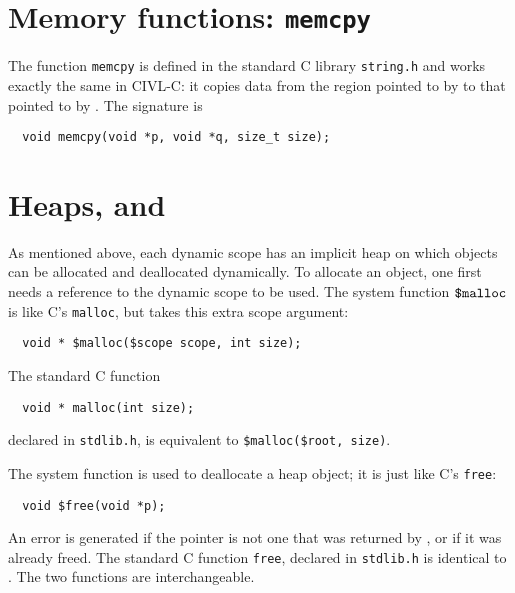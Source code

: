 \section{Memory functions: \texttt{memcpy}}

The function \texttt{memcpy} is defined in the standard C library
\texttt{string.h} and works exactly the same in CIVL-C: it copies
data from the region pointed to by  to that pointed to by
.  The signature is

\begin{verbatim}
  void memcpy(void *p, void *q, size_t size);
\end{verbatim}

\section{Heaps, \cmalloc{} and \cfree}

As mentioned above, each dynamic scope has an implicit heap on which
objects can be allocated and deallocated dynamically.  To allocate an
object, one first needs a reference to the dynamic scope to be used.
The system function $\mbox{\texttt{\${}malloc}}$ is like C's \texttt{malloc}, but takes
this extra scope argument:
\begin{verbatim}
  void * $malloc($scope scope, int size);
\end{verbatim}
The standard C function
\begin{verbatim}
  void * malloc(int size);
\end{verbatim}
declared in \texttt{stdlib.h}, is equivalent to \verb!$malloc($root, size)!.

The system function \cfree{} is used to deallocate a heap object;
it is just like C's \texttt{free}:
\begin{verbatim}
  void $free(void *p);
\end{verbatim}
An error is generated if the pointer is not one that was returned by
\cmalloc, or if it was already freed.  The standard C function
\texttt{free}, declared in \texttt{stdlib.h} is identical to \cfree.
The two functions are interchangeable.



